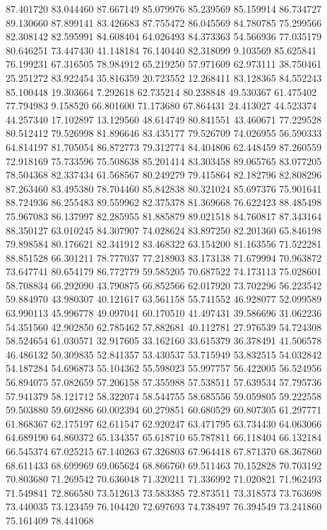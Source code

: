 87.401720
83.044460
87.667149
85.079976
85.239569
85.159914
86.734727
89.130660
87.899141
83.426683
87.755472
86.045569
84.780785
75.299566
82.308142
82.595991
84.608404
64.026493
84.373363
54.566936
77.035179
80.646251
73.447430
41.148184
76.140440
82.318099
9.103569
85.625841
76.199231
67.316505
78.984912
65.219250
57.971609
62.973111
38.750461
25.251272
83.922454
35.816359
20.723552
12.268411
83.128365
84.552243
85.100448
19.303664
7.292618
62.735214
80.238848
49.530367
61.475402
77.794983
9.158520
66.801600
71.173680
67.864431
24.413027
44.523374
44.257340
17.102897
13.129560
48.614749
80.841551
43.460671
77.229528
80.512412
79.526998
81.896646
83.435177
79.526709
74.026955
56.590333
64.814197
81.705054
86.872773
79.312774
84.404806
62.448459
87.260559
72.918169
75.733596
75.508638
85.201414
83.303458
89.065765
83.077205
78.504368
82.337434
61.568567
80.249279
79.415864
82.182796
82.808296
87.263460
83.495380
78.704460
85.842838
80.321024
85.697376
75.901641
88.724936
86.255483
89.559962
82.375378
81.369668
76.622423
88.485498
75.967083
86.137997
82.285955
81.885879
89.021518
84.760817
87.343164
88.350127
63.010245
84.307907
74.028624
83.897250
82.201360
65.846198
79.898584
80.176621
82.341912
83.468322
63.154200
81.163556
71.522281
88.851528
66.301211
78.777037
77.218903
83.173138
71.679994
70.963872
73.647741
80.654179
86.772779
59.585205
70.687522
74.173113
75.028601
58.708834
66.292090
43.790875
66.852566
62.017920
73.702296
56.223542
59.884970
43.980307
40.121617
63.561158
55.741552
46.928077
52.099589
63.990113
45.996778
49.097041
60.170510
41.497431
39.586696
31.062236
54.351560
42.902850
62.785462
57.882681
40.112781
27.976539
54.724308
58.524654
61.030571
32.917605
33.162160
33.615379
36.378491
41.506578
46.486132
50.309835
52.841357
53.430537
53.715949
53.832515
54.032842
54.187284
54.696873
55.104362
55.598023
55.997757
56.422005
56.524956
56.894075
57.082659
57.206158
57.355988
57.538511
57.639534
57.795736
57.941379
58.121712
58.322074
58.544755
58.685556
59.059805
59.222558
59.503880
59.602886
60.002394
60.279851
60.680529
60.807305
61.297771
61.868367
62.175197
62.611547
62.920247
63.471795
63.734430
64.063066
64.689190
64.860372
65.134357
65.618710
65.787811
66.118404
66.132184
66.545374
67.025215
67.140263
67.326803
67.964418
67.871370
68.367860
68.611433
68.699969
69.065624
68.866760
69.511463
70.152828
70.703192
70.803680
71.269542
70.636048
71.320211
71.336992
71.020821
71.962493
71.549841
72.866580
73.512613
73.583385
72.873511
73.318573
73.763698
73.440035
73.123459
76.104420
72.697693
74.738497
76.394549
73.241860
75.161409
78.441068
